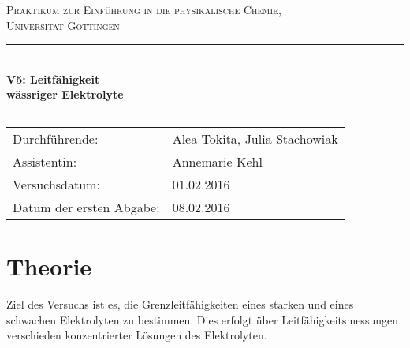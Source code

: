 \documentclass[12pt,a4paper,titlepage,headinclude,bibtotoc]{scrartcl}
\begin{document}
\begin{titlepage}
\centering
\textsc{\Large Praktikum zur Einführung in die physikalische Chemie,\\[1.5ex] Universität Göttingen}

\vspace*{2cm}

\rule{\textwidth}{1pt}\\[0.5cm]
{\huge \bfseries
  V5: Leitfähigkeit\\[1.5ex]
  wässriger Elektrolyte}\\[0.5cm]
\rule{\textwidth}{1pt}

\vspace*{1cm}


\begin{Large}
\begin{tabular}{ll}
Durchführende: &  Alea Tokita, Julia Stachowiak\\
Assistentin: & Annemarie Kehl\\
 Versuchsdatum: & 01.02.2016\\
 Datum der ersten Abgabe: & 08.02.2016\\

\end{tabular}
\end{Large}

\vspace*{1.5cm}

\begin{Large}
\end{Large}

\end{titlepage}

\tableofcontents

\newpage

\section{Theorie}
Ziel des Versuchs ist es, die Grenzleitfähigkeiten eines starken und eines schwachen Elektrolyten zu bestimmen. Dies erfolgt über Leitfähigkeitsmessungen verschieden konzentrierter Lösungen des Elektrolyten.
\end{document}
